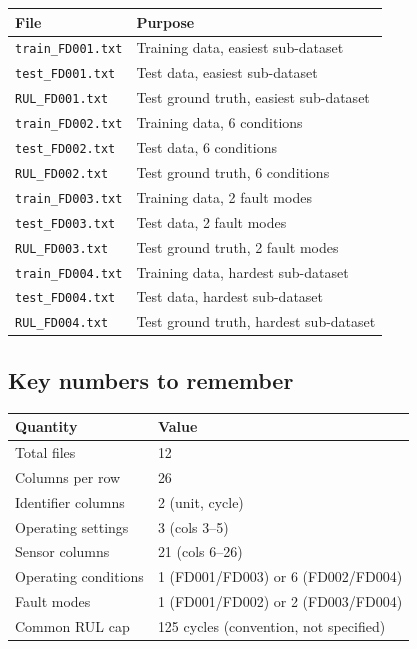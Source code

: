 \documentclass[11pt, a4paper]{article}
\begin{document}
\begin{center}
\begin{tabular}{@{}ll@{}}
  \toprule
  File & Purpose \\
  \midrule
  \texttt{train\_FD001.txt} & Training data, easiest sub-dataset \\
  \texttt{test\_FD001.txt}  & Test data, easiest sub-dataset \\
  \texttt{RUL\_FD001.txt}   & Test ground truth, easiest sub-dataset \\
  \texttt{train\_FD002.txt} & Training data, 6 conditions \\
  \texttt{test\_FD002.txt}  & Test data, 6 conditions \\
  \texttt{RUL\_FD002.txt}   & Test ground truth, 6 conditions \\
  \texttt{train\_FD003.txt} & Training data, 2 fault modes \\
  \texttt{test\_FD003.txt}  & Test data, 2 fault modes \\
  \texttt{RUL\_FD003.txt}   & Test ground truth, 2 fault modes \\
  \texttt{train\_FD004.txt} & Training data, hardest sub-dataset \\
  \texttt{test\_FD004.txt}  & Test data, hardest sub-dataset \\
  \texttt{RUL\_FD004.txt}   & Test ground truth, hardest sub-dataset \\
  \bottomrule
\end{tabular}
\end{center}

\subsection{Key numbers to remember}

\begin{center}
\begin{tabular}{@{}ll@{}}
  \toprule
  Quantity & Value \\
  \midrule
  Total files           & 12 \\
  Columns per row       & 26 \\
  Identifier columns    & 2 (unit, cycle) \\
  Operating settings    & 3 (cols 3--5) \\
  Sensor columns        & 21 (cols 6--26) \\
  Operating conditions  & 1 (FD001/FD003) or 6 (FD002/FD004) \\
  Fault modes           & 1 (FD001/FD002) or 2 (FD003/FD004) \\
  Common RUL cap        & 125 cycles (convention, not specified) \\
  \bottomrule
\end{tabular}
\end{center}

\end{document}

